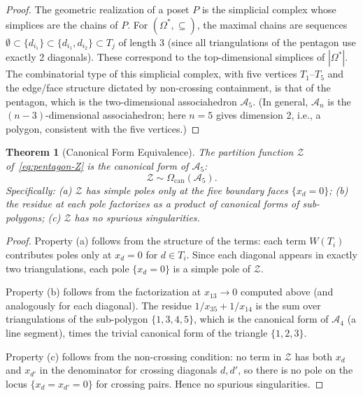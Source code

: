 \documentclass[12pt, oneside]{amsart}
\theoremstyle{plain}
\newtheorem{theorem}{Theorem}[section]
\theoremstyle{definition}
\theoremstyle{remark}
\newcommand{\OmKS}{\Omega}
\begin{document}
\begin{proof}
The geometric realization of a poset $P$ is the simplicial complex whose simplices are the chains of $P$. For $(\OmKS^*, \subseteq)$, the maximal chains are sequences $\emptyset \subset \{d_{i_1}\} \subset \{d_{i_1}, d_{i_2}\} \subset T_j$ of length 3 (since all triangulations of the pentagon use exactly 2 diagonals). These correspond to the top-dimensional simplices of $|\OmKS^*|$. The combinatorial type of this simplicial complex, with five vertices $T_1$--$T_5$ and the edge/face structure dictated by non-crossing containment, is that of the pentagon, which is the two-dimensional associahedron $\mathcal{A}_5$. (In general, $\mathcal{A}_n$ is the $(n-3)$-dimensional associahedron; here $n=5$ gives dimension 2, i.e., a polygon, consistent with the five vertices.)
\end{proof}

\begin{theorem}[Canonical Form Equivalence]
The partition function $\mathcal{Z}$ of~\eqref{eq:pentagon-Z} is the canonical form of $\mathcal{A}_5$:
\[
  \mathcal{Z} \sim \Omega_{\mathrm{can}}(\mathcal{A}_5).
\]
Specifically: (a) $\mathcal{Z}$ has simple poles only at the five boundary faces $\{x_d = 0\}$; (b) the residue at each pole factorizes as a product of canonical forms of sub-polygons; (c) $\mathcal{Z}$ has no spurious singularities.
\end{theorem}

\begin{proof}
Property (a) follows from the structure of the terms: each term $W(T_i)$ contributes poles only at $x_d = 0$ for $d \in T_i$. Since each diagonal appears in exactly two triangulations, each pole $\{x_d = 0\}$ is a simple pole of $\mathcal{Z}$.

Property (b) follows from the factorization at $x_{13} \to 0$ computed above (and analogously for each diagonal). The residue $1/x_{35} + 1/x_{14}$ is the sum over triangulations of the sub-polygon $\{1,3,4,5\}$, which is the canonical form of $\mathcal{A}_4$ (a line segment), times the trivial canonical form of the triangle $\{1,2,3\}$.

Property (c) follows from the non-crossing condition: no term in $\mathcal{Z}$ has both $x_d$ and $x_{d'}$ in the denominator for crossing diagonals $d, d'$, so there is no pole on the locus $\{x_d = x_{d'} = 0\}$ for crossing pairs. Hence no spurious singularities.
\end{proof}
\end{document}
